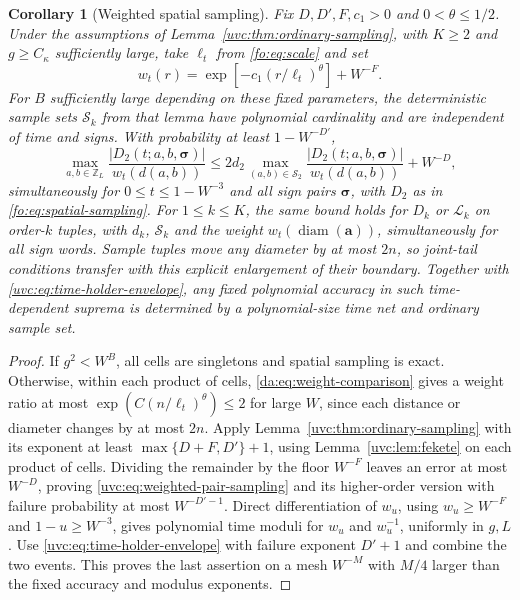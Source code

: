 \documentclass[11pt]{article}
\numberwithin{equation}{section}
\newtheorem{corollary}[theorem]{Corollary}
\theoremstyle{remark}
\newcommand{\Z}{\mathbb Z}
\newcommand{\diam}{\operatorname{diam}}
\newcommand{\cL}{\mathcal L}
\begin{document}
\begin{corollary}[Weighted spatial sampling]
\label{uvc:cor:weighted-sampling}
Fix $D,D',F,c_1>0$ and $0<\theta\le1/2$.
Under the assumptions of Lemma~\ref{uvc:thm:ordinary-sampling}, with
$K\ge2$ and $g\ge C_\kappa$ sufficiently large, take $\ell_t$ from
\eqref{fo:eq:scale} and set
\[
 w_t(r)=\exp[-c_1(r/\ell_t)^\theta]+W^{-F}.
\]
For $B$ sufficiently large depending on these fixed parameters,
the deterministic sample sets $\mathcal S_k$ from that lemma have
polynomial cardinality and are independent of time and signs.
With probability at least $1-W^{-D'}$,
\begin{equation}\label{uvc:eq:weighted-pair-sampling}
 \max_{a,b\in\Z_L}\frac{|D_2(t;a,b,\boldsymbol\sigma)|}{w_t(d(a,b))}
 \le 2d_2\max_{(a,b)\in\mathcal S_2}
       \frac{|D_2(t;a,b,\boldsymbol\sigma)|}{w_t(d(a,b))}+W^{-D},
\end{equation}
simultaneously for $0\le t\le1-W^{-3}$ and all sign pairs
$\boldsymbol\sigma$, with $D_2$ as in \eqref{fo:eq:spatial-sampling}.
For $1\le k\le K$, the same bound holds for $D_k$ or $\cL_k$ on
order-$k$ tuples, with $d_k$, $\mathcal S_k$ and the weight
$w_t(\diam(\boldsymbol a))$, simultaneously for all sign words.
Sample tuples move any diameter by at most $2n$, so joint-tail
conditions transfer with this explicit enlargement of their boundary.
Together with \eqref{uvc:eq:time-holder-envelope}, any fixed polynomial
accuracy in such time-dependent suprema is determined by a
polynomial-size time net and ordinary sample set.
\end{corollary}
\begin{proof}
If $g^2<W^B$, all cells are singletons and spatial sampling is exact.
Otherwise, within each product of cells, \eqref{da:eq:weight-comparison} gives a
weight ratio at most $\exp(C(n/\ell_t)^\theta)\le2$ for large $W$,
since each distance or diameter changes by at most $2n$.
Apply Lemma~\ref{uvc:thm:ordinary-sampling} with its exponent at least
$\max\{D+F,D'\}+1$, using Lemma~\ref{uvc:lem:fekete} on each product of cells.
Dividing the remainder by the floor $W^{-F}$ leaves an error at most
$W^{-D}$, proving \eqref{uvc:eq:weighted-pair-sampling} and its
higher-order version with failure probability at most $W^{-D'-1}$.
Direct differentiation of $w_u$, using $w_u\ge W^{-F}$ and
$1-u\ge W^{-3}$, gives polynomial time moduli for $w_u$ and $w_u^{-1}$,
uniformly in $g,L$. Use \eqref{uvc:eq:time-holder-envelope} with failure
exponent $D'+1$ and combine the two events. This proves the last
assertion on a mesh $W^{-M}$ with $M/4$ larger than
the fixed accuracy and modulus exponents.
\end{proof}
\end{document}
